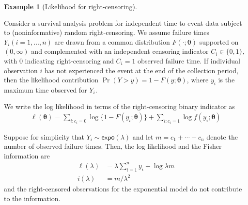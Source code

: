\documentclass[
  11pt,
  letterpaper,
]{scrbook}
\theoremstyle{definition}
\theoremstyle{plain}
\theoremstyle{plain}
\theoremstyle{definition}
\newtheorem{example}{Example}[chapter]
\theoremstyle{definition}
\theoremstyle{remark}
\begin{document}
\begin{example}[Likelihood for
right-censoring]\protect\hypertarget{exm-likelihood-survival}{}\label{exm-likelihood-survival}

Consider a survival analysis problem for independent time-to-event data
subject to (noninformative) random right-censoring. We assume failure
times \(Y_i (i=1, \ldots, n)\) are drawn from a common distribution
\(F(\cdot; \boldsymbol{\theta})\) supported on \((0, \infty)\) and
complemented with an independent censoring indicator
\(C_i \in \{0,1\}\), with \(0\) indicating right-censoring and \(C_i=1\)
observed failure time. If individual observation \(i\) has not
experienced the event at the end of the collection period, then the
likelihood contribution \(\Pr(Y > y) = 1-F(y; \boldsymbol{\theta})\),
where \(y_i\) is the maximum time observed for \(Y_i\).

We write the log likelihood in terms of the right-censoring binary
indicator as \begin{align*}
\ell(\boldsymbol{\theta}) = \sum_{i: c_i=0} \log \{1- F(y_i; \boldsymbol{\theta})\} + \sum_{i: c_i=1} \log f(y_i; \boldsymbol{\theta})
\end{align*}

Suppose for simplicity that \(Y_i \sim \mathsf{expo}(\lambda)\) and let
\(m=c_1 + \cdots + c_n\) denote the number of observed failure times.
Then, the log likelihood and the Fisher information are \begin{align*}
\ell(\lambda) &= \lambda \sum_{i=1}^n y_i + \log \lambda m\\
i(\lambda) &= m/\lambda^2
\end{align*} and the right-censored observations for the exponential
model do not contribute to the information.

\end{example}
\end{document}
